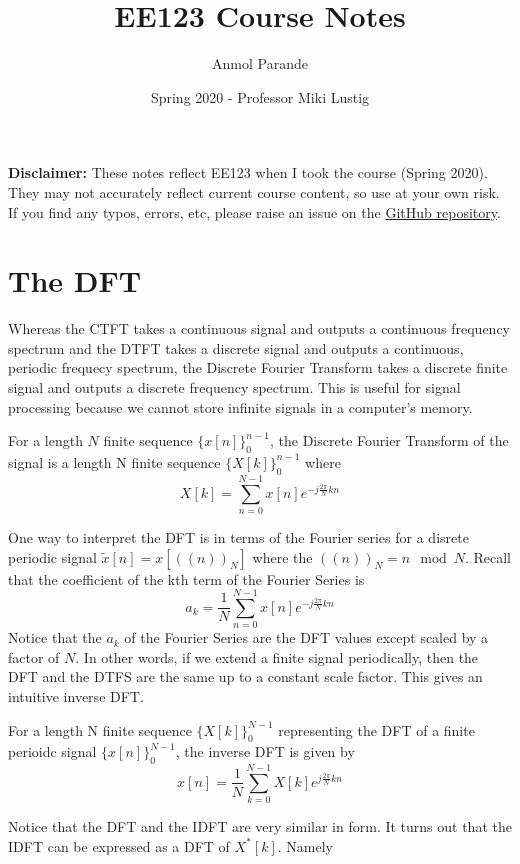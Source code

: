 

\title{EE123 Course Notes}
\author{Anmol Parande}
\date{Spring 2020 - Professor Miki Lustig}
\maketitle
\textbf{Disclaimer: }These notes reflect EE123 when I took the course (Spring 2020). They may not accurately reflect current course content, so use at your own risk.
If you find any typos, errors, etc, please raise an issue on the \href{https://github.com/parandea17/BerkeleyNotes}{GitHub repository}.\\
\tableofcontents
\newpage
\section{The DFT}
Whereas the CTFT takes a continuous signal and outputs a continuous frequency spectrum and the DTFT takes a discrete signal
and outputs a continuous, periodic frequecy spectrum, the Discrete Fourier Transform takes a discrete finite signal and outputs
a discrete frequency spectrum. This is useful for signal processing because we cannot store infinite signals in a computer's memory.
\begin{definition}
  For a length $N$ finite sequence $\{x[n]\}^{n-1}_{0}$, the Discrete Fourier Transform of the signal
  is a length N finite sequence $\{X[k]\}^{n-1}_{0}$ where
  \[
	X[k] = \sum_{n=0}^{N-1}{x[n]e^{-j\frac{2\pi}{N}kn}} 
  \]
  \label{defn:dft}
\end{definition}
One way to interpret the DFT is in terms of the Fourier series for a disrete periodic signal $\tilde{x}[n]=x[((n))_N]$ where the $((n))_N = n \mod N$.
Recall that the coefficient of the kth term of the Fourier Series is
\[
  a_k = \frac{1}{N}\sum_{n=0}^{N-1}{x[n]e^{-j\frac{2\pi}{N}kn}}
\]
Notice that the $a_k$ of the Fourier Series are the DFT values except scaled by a factor of $N$. In other words, if we extend a finite signal periodically, then the DFT and the DTFS are the same up to a constant scale factor.
This gives an intuitive inverse DFT.
\begin{definition}
  For a length N finite sequence $\{X[k]\}^{N-1}_{0}$ representing the DFT of a finite perioidc signal $\{x[n]\}^{N-1}_{0}$,
  the inverse DFT is given by
  \[
	x[n] = \frac{1}{N}\sum_{k=0}^{N-1}{X[k]e^{j\frac{2\pi}{N}kn}} 
  \]
  \label{defn:idft}
\end{definition}
Notice that the DFT and the IDFT are very similar in form. It turns out that the IDFT can be expressed as a DFT of $X^*[k]$. Namely
